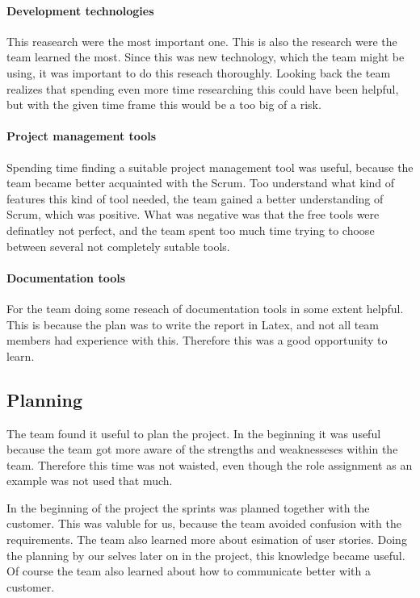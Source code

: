 \paragraph{Development technologies}
This reasearch were the most important one. This is also the research were the team learned the most. Since this was new technology, which the team might be using, it was important to do this reseach thoroughly. Looking back the team realizes that spending even more time researching this could have been helpful, but with the given time frame this would be a too big of a risk. 

\paragraph{Project management tools}
Spending time finding a suitable project management tool was useful, because the team became better acquainted with the Scrum. Too understand what kind of features this kind of tool needed, the team gained a better understanding of Scrum, which was positive. What was negative was that the free tools were definatley not perfect, and the team spent too much time trying to choose between several not completely sutable tools. 

\paragraph{Documentation tools}
For the team doing some reseach of documentation tools in some extent helpful. This is because the plan was to write the report in Latex, and not all team members had experience with this. Therefore this was a good opportunity to learn.

\subsection{Planning}

The team found it useful to plan the project. In the beginning it was useful because the team got more aware of the strengths and weaknesseses within the team. Therefore this time was not waisted, even though the role assignment as an example was not used that much. 

In the beginning of the project the sprints was planned together with the customer. This was valuble for us, because the team avoided confusion with the requirements. The team also learned more about esimation of user stories. Doing the planning by our selves later on in the project, this knowledge became useful. Of course the team also learned about how to communicate better with a customer. 

